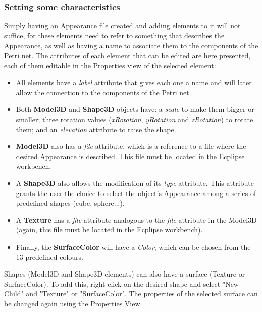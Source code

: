 \subsubsection{Setting some characteristics}
\label{sec:userguide:appearance:edit}
Simply having an Appearance file created and adding elements to it will not suffice, for these elements need to refer to something that describes the Appearance, as well as having a name to associate them to the components of the Petri net. The attributes of each element that can be edited are here presented, each of them editable in the Properties view of the selected element:
   
\begin{itemize}
  \item All elements have a \textit{label} attribute that gives each one a name and will later allow the connection to the components of the Petri net.
  \item Both \textbf{Model3D} and \textbf{Shape3D} objects have: a \textit{scale} to make them bigger or smaller; three rotation values (\textit{xRotation}, \textit{yRotation} and \textit{zRotation}) to rotate them; and an \textit{elevation} attribute to raise the shape.
  \item \textbf{Model3D} also has a \textit{file} attribute, which is a reference to a file where the desired Appearance is described. This file must be located in the Ecplipse workbench.
  \item A \textbf{Shape3D} also allows the modification of its \textit{type} attribute. This attribute grants the user the choice to select the object's Appearance among a series of predefined shapes (cube, sphere...).
  \item A \textbf{Texture} has a \textit{file} attribute analogous to the \textit{file} attribute in the Model3D (again, this file must be located in the Ecplipse workbench).
  \item Finally, the \textbf{SurfaceColor} will have a \textit{Color}, which can be chosen from the 13 predefined colours.
\end{itemize}

Shapes (Model3D and Shape3D elements) can also have a surface (Texture or SurfaceColor). To add this, right-click on the desired shape and select "New Child" and "Texture" or "SurfaceColor". The properties of the selected surface can be changed again using the Properties View.


